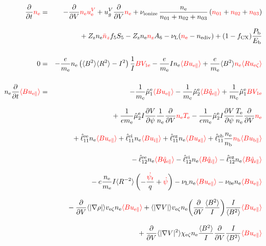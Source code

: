 \documentclass[11pt]{article}
\def\r#1{{\rm#1}}
\def\aves#1{\langle#1\rangle}
\def\dd#1#2{\frac{\partial #1}{\partial #2}}
\def\para{\parallel}
\def\ddV{\frac{\partial}{\partial V}}
\def\ddt{\frac{\partial}{\partial t}}
\def\psid{\dot{\psi}}
\def\psit{\psi_t}
\def\psitd{\dot{\psit}}
\def\me{m_\r{e}}
\def\nee{n_\r{e}}
\def\nz{n_\r{z}}
\def\nb{n_\r{b}}
\def\Te{T_\r{e}}
\def\Zz{Z_\r{z}}
\def\uzt#1{u_{\r{#1}\zeta}}
\def\upara#1{u_{\r{#1}\para}}
\def\qhatpara#1{\hat{q}_{\r{#1}\para}}
\def\uV#1{u_\r{#1}^V}
\def\ugV{u_{g}^V}
\def\chis#1{\chi_\r{#1}}
\def\nun#1{\nu_\r{0#1}}
\def\ndiv#1{n_\r{#1div}}
\def\bri{\aves{B^2}\aves{R^2} - I^2}
\def\Pb{P_\r{b}}
\def\Eb{E_\r{b}}
\def\nna{n_{01}}
\def\nnb{n_{02}}
\def\nnc{n_{03}}
\def\nnz{\bar{n}_{z}}
\def\fCX{f_\r{CX}}
\def\nuL{\nu_\r{L}}
\def\nuion{\nu_\r{ionize}}
\def\red#1{\textcolor{red}{#1}}
\begin{document}
%
\begin{eqnarray}
  \ddt \red{\nee}  &=&
%
  - \ddV \red{\nee\uV{e}}
%
  + \ugV \ddV \red{\nee}
%
  + \nuion\, \frac{\nee}{\nna + \nnb + \nnc}\, (\red{\nna} + \red{\nnb}
  + \red{\nnc})
\nonumber\\[3mm]&&{}
%
  + \Zz \nee \red{\nnz} f_5S_5 - \Zz \nee \red{\nz} A_6
%
  - \nuL (\red{\nee} - \ndiv{e})
%
  + (1 - \fCX) \frac{\Pb}{\Eb}
\\[5mm]
  0 &=&
%
  - \frac{e}{\me} \nee \left( \bri \right) \frac{1}{I} \red{BV_{1\r{e}}}
%
  - \frac{e}{\me} I \nee \red{\aves{B\upara{e}}}
%
  + \frac{e}{\me} \aves{B^2} \red{\nee \aves{R\uzt{e}}}
\\[5mm]
  \nee \ddt \red{\aves{B \upara{e}}} &=&
%
  - \frac{1}{\me} \hat{\mu}_1^\r{e} \red{\aves{B \upara{e}}}
  - \frac{1}{\me} \hat{\mu}_2^\r{e} \red{\aves{B \qhatpara{e}}}
%
  + \frac{1}{\me} \hat{\mu}_1^\r{e} \red{BV_{1\r{e}}}
\nonumber\\[3mm]&&{}
%
  + \frac{1}{e\me} \hat{\mu}_2^\r{e} I \dd{V}{\psi} \frac{1}{\nee} \ddV
  \red{\nee \Te}
  - \frac{1}{e\me} \hat{\mu}_2^\r{e} I \dd{V}{\psi} \frac{\Te}{\nee} \ddV
  \red{\nee}
\nonumber\\[3mm]&&{}
%
  + \hat{\ell}_{11}^{\r{ee}} \nee \red{\aves{B \upara{e}}}
  + \hat{\ell}_{11}^{\r{ei}} \nee \red{\aves{B \upara{i}}}
  + \hat{\ell}_{11}^{\r{ez}} \nee \red{\aves{B \upara{z}}}
  + \hat{\ell}_{11}^{\r{eb}} \frac{\nee}{\nb} \red{\nb \aves{B \upara{b}}}
\nonumber\\[3mm]&&{}
%
  - \hat{\ell}_{12}^{\r{ee}} \nee \red{\aves{B \qhatpara{e}}}
  - \hat{\ell}_{12}^{\r{ei}} \nee \red{\aves{B \qhatpara{i}}}
  - \hat{\ell}_{12}^{\r{ez}} \nee \red{\aves{B \qhatpara{z}}}
\nonumber\\[3mm]&&{}
%
  - e \frac{\nee}{\me} I \aves{R^{-2}} \left( - \frac{\red{\psitd}}{q} + \red{\psid} \right)
%
%
  - \nuL \nee \red{\aves{B \upara{e}}}
%
  - \nun{e} \nee \red{\aves{B \upara{e}}}
\nonumber\\[3mm]&&{}
%
  - \ddV \aves{|\nabla \rho|} v_{\r{e}\zeta} \nee \red{\aves{B \upara{e}}}
%
  + \aves{|\nabla V|} v_{\r{e}\zeta} \nee 
  \biggl(\ddV \frac{\aves{B^2}}{I} \biggl) \frac{I}{\aves{B^2}} \red{\aves{B \upara{e}}}
\nonumber\\[3mm]&&{}
%
  + \ddV \aves{|\nabla V|^2} \chis{e\zeta} \nee
  \frac{\aves{B^2}}{I} \ddV \frac{I}{\aves{B^2}} \red{\aves{B \upara{e}}}

\end{eqnarray}
\end{document}
